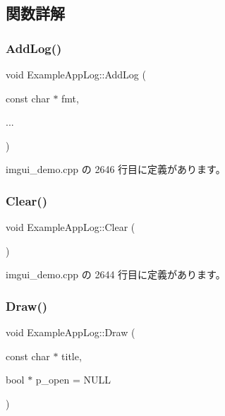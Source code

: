 \subsection{関数詳解}
\mbox{\label{struct_example_app_log_afd296fb3b2559acd341fd92883f8f571}} 
\subsubsection{\texorpdfstring{Add\+Log()}{AddLog()}}
{\footnotesize\ttfamily void Example\+App\+Log\+::\+Add\+Log (\begin{DoxyParamCaption}\item[{const char $\ast$}]{fmt,  }\item[{}]{... }\end{DoxyParamCaption})\hspace{0.3cm}{\ttfamily [inline]}}



 imgui\+\_\+demo.\+cpp の 2646 行目に定義があります。

\mbox{\label{struct_example_app_log_ab9c298defddbb106fdfe4ab16c5eebac}} 
\subsubsection{\texorpdfstring{Clear()}{Clear()}}
{\footnotesize\ttfamily void Example\+App\+Log\+::\+Clear (\begin{DoxyParamCaption}{ }\end{DoxyParamCaption})\hspace{0.3cm}{\ttfamily [inline]}}



 imgui\+\_\+demo.\+cpp の 2644 行目に定義があります。

\mbox{\label{struct_example_app_log_a5ad3a4bdb89171b84aeaff96948a1f77}} 
\subsubsection{\texorpdfstring{Draw()}{Draw()}}
{\footnotesize\ttfamily void Example\+App\+Log\+::\+Draw (\begin{DoxyParamCaption}\item[{const char $\ast$}]{title,  }\item[{bool $\ast$}]{p\+\_\+open = {\ttfamily NULL} }\end{DoxyParamCaption})\hspace{0.3cm}{\ttfamily [inline]}}




